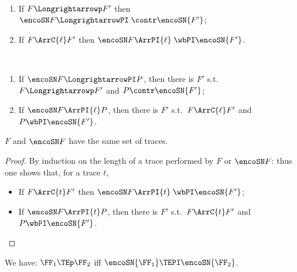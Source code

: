 \begin{theorem}
\label{t:CBNpogs_short_weak}
$ $ \begin{enumerate}

\item  If $F \Longrightarrowp F'$ then 
$ \encoSN F \LongrightarrowPI \; \contr \encoSN {F'}$; 

\item  If $F \ArrC{\ell} F'$  then 
$ \encoSN F \ArrPI{\ell} \;  \wbPI  \encoSN  {F'}$.
\end{enumerate}
\end{theorem} 


\begin{theorem}
\label{t:CBNpogs_short_converse_weak}
$ $ \begin{enumerate}

\item  If
$ \encoSN F \LongrightarrowPI  P$, then there is $F'$ s.t.\  
 $F \Longrightarrowp F'$ and 
$P 
\contr \encoSN {F'}$;

\item  If
$ \encoSN F \ArrPI{\ell}  P$, then there is $F'$ s.t.\  
 $F \ArrC{\ell} F'$ and 
$P 
\wbPI \encoSN {F'}$.
\end{enumerate}
\end{theorem} 



\begin{corollary}
\label{c:CBNpogs_pi}
 $F$ and $ \encoSN F$ have the same set of traces. 
\end{corollary}  

\begin{proof}
By induction on the length of a trace performed by 
 $F$  or $ \encoSN F$: thus one shows that, for a trace $t$,
\begin{itemize}
\item  If $F \ArrC{t} F'$  then 
$ \encoSN F \ArrPI{t}\;  \wbPI  \encoSN  {F'}$;
\item  If
$ \encoSN F \ArrPI{t}  P$, then there is $F'$ s.t.\  
 $F \ArrC{t} F'$ and 
$P 
\wbPI \encoSN {F'}$.\qedhere
\end{itemize} 
\end{proof} 



\begin{corollary}
\label{c:CBNpogs_pi_traces}
We have: 
 $\FF_1 \TEp \FF_2$ iff 
 $ \encoSN {\FF_1} \TEPI  \encoSN {\FF_2}$.  
\end{corollary}  


